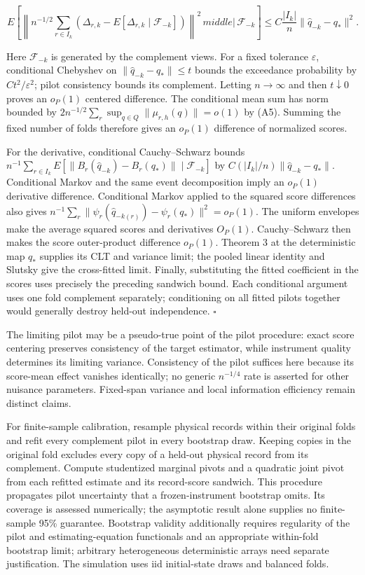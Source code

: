 \documentclass[
  american,
  11pt,
]{article}
\begin{document}
\[
E\left[\left\|n^{-1/2}\sum_{r\in I_k}(\Delta_{r,k}-E[\Delta_{r,k}\mid\mathcal F_{-k}])\right\|^2\,middle|\,\mathcal F_{-k}\right]
\le C\frac{|I_k|}{n}\|\widehat q_{-k}-q_*\|^2.
\]

Here \(\mathcal F_{-k}\) is generated by the complement views. For a
fixed tolerance \(\varepsilon\), conditional Chebyshev on
\(\|\widehat q_{-k}-q_*\|\le t\) bounds the exceedance probability by
\(Ct^2/\varepsilon^2\); pilot consistency bounds its complement. Letting
\(n\to\infty\) and then \(t\downarrow0\) proves an \(o_P(1)\) centered
difference. The conditional mean sum has norm bounded by
\(2n^{-1/2}\sum_r\sup_{q\in Q}\|\mu_{r,h}(q)\|=o(1)\) by (A5). Summing
the fixed number of folds therefore gives an \(o_P(1)\) difference of
normalized scores.

For the derivative, conditional Cauchy--Schwarz bounds
\(n^{-1}\sum_{r\in I_k}E[\|B_r(\widehat q_{-k})-B_r(q_*)\|\mid\mathcal F_{-k}]\)
by \(C(|I_k|/n)\|\widehat q_{-k}-q_*\|\). Conditional Markov and the
same event decomposition imply an \(o_P(1)\) derivative difference.
Conditional Markov applied to the squared score differences also gives
\(n^{-1}\sum_r\|\psi_r(\widehat q_{-k(r)})-\psi_r(q_*)\|^2=o_P(1)\). The
uniform envelopes make the average squared scores and derivatives
\(O_P(1)\). Cauchy--Schwarz then makes the score outer-product
difference \(o_P(1)\). Theorem 3 at the deterministic map \(q_*\)
supplies its CLT and variance limit; the pooled linear identity and
Slutsky give the cross-fitted limit. Finally, substituting the fitted
coefficient in the scores uses precisely the preceding sandwich bound.
Each conditional argument uses one fold complement separately;
conditioning on all fitted pilots together would generally destroy
held-out independence. \(\square\)

The limiting pilot may be a pseudo-true point of the pilot procedure:
exact score centering preserves consistency of the target estimator,
while instrument quality determines its limiting variance. Consistency
of the pilot suffices here because its score-mean effect vanishes
identically; no generic \(n^{-1/4}\) rate is asserted for other nuisance
parameters. Fixed-span variance and local information efficiency remain
distinct claims.

For finite-sample calibration, resample physical records within their
original folds and refit every complement pilot in every bootstrap draw.
Keeping copies in the original fold excludes every copy of a held-out
physical record from its complement. Compute studentized marginal pivots
and a quadratic joint pivot from each refitted estimate and its
record-score sandwich. This procedure propagates pilot uncertainty that
a frozen-instrument bootstrap omits. Its coverage is assessed
numerically; the asymptotic result alone supplies no finite-sample 95\%
guarantee. Bootstrap validity additionally requires regularity of the
pilot and estimating-equation functionals and an appropriate within-fold
bootstrap limit; arbitrary heterogeneous deterministic arrays need
separate justification. The simulation uses iid initial-state draws and
balanced folds.
\end{document}
